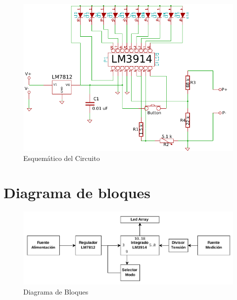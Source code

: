\documentclass[12pt,a4paper]{article}
\begin{document}
		\begin{figure}[H]
			\centering
			\includegraphics[scale=1.2]{images/sch.pdf}\caption{Esquemático del Circuito}
			\label{fig:circesq}
		\end{figure}

	\section{Diagrama de bloques}

		\begin{figure}[H]
			\centering
			\includegraphics[scale=1.2]{images/bloque.pdf}\caption{Diagrama de Bloques}
			\label{fig:bloque}
		\end{figure}
\end{document}
